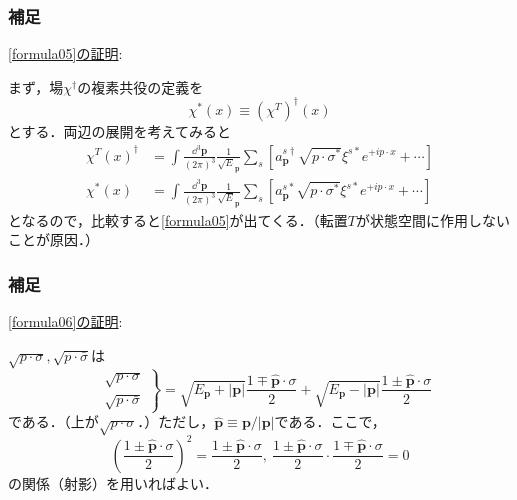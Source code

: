 \documentclass[pdflatex,unicode,ja=standard,12pt]{beamer}
\begin{document}
\begin{frame}[noframenumbering]

  \frametitle{補足 \subsecname}
  \thispagestyle{empty}

  \uline{\eqref{formula05}の証明}:

  \vspace{10pt}

  まず，場$\chi^{\dag}$の複素共役の定義を
  \begin{equation}
    \chi^{*}(x)
    \equiv
    (\chi^{T})^{\dag}(x)
  \end{equation}
  とする．両辺の展開を考えてみると
  \begin{align}    
    {\chi^{T}(x)}^{\dag}
    &=
    \int\frac{\dd^3\mathbf{p}}{(2\pi)^3}
    \frac{1}{\sqrt{E}_{\mathbf{p}}}
    \sum_{s}
    \left[  
      a_{\mathbf{p}}^{s\dag}
      \sqrt{p\cdot\sigma^{*}}\xi^{s*}e^{+ip\cdot x}
      +
      \cdots
    \right]
    \\    
    \chi^{*}(x)
    &=
    \int\frac{\dd^3\mathbf{p}}{(2\pi)^3}
    \frac{1}{\sqrt{E}_{\mathbf{p}}}
    \sum_{s}
    \left[  
      a_{\mathbf{p}}^{s*}
      \sqrt{p\cdot\sigma^{*}}\xi^{s*}e^{+ip\cdot x}
      +
      \cdots
    \right]
  \end{align}
  となるので，比較すると\eqref{formula05}が出てくる．（転置$T$が状態空間に作用しないことが原因．）

\end{frame}


\begin{frame}[noframenumbering]

  \frametitle{補足 \subsecname}
  \thispagestyle{empty}

  \uline{\eqref{formula06}の証明}:

  \vspace{10pt}

  $\sqrt{p\cdot\sigma},\sqrt{p\cdot\bar{\sigma}}$は
  \begin{equation}
    \left.
      \begin{alignedat}{1}
        &\sqrt{p\cdot\sigma}
        \\
        &\sqrt{p\cdot\bar{\sigma}}
      \end{alignedat}
    \right\}
    =
    \sqrt{E_{\mathbf{p}}+|\mathbf{p}|}
    \frac{1\mp\hat{\mathbf{p}}\cdot\sigma}{2}
    +
    \sqrt{E_{\mathbf{p}}-|\mathbf{p}|}
    \frac{1\pm\hat{\mathbf{p}}\cdot\sigma}{2}
  \end{equation}
  である．（上が$\sqrt{p\cdot\sigma}$．）ただし，$\hat{\mathbf{p}}\equiv\mathbf{p}/|\mathbf{p}|$である．ここで，
  \begin{equation}
    \left(  
      \frac{1\pm\hat{\mathbf{p}}\cdot\sigma}{2}
    \right)^2
    =    
    \frac{1\pm\hat{\mathbf{p}}\cdot\sigma}{2}
    ,\ 
    \frac{1\pm\hat{\mathbf{p}}\cdot\sigma}{2}
    \cdot
    \frac{1\mp\hat{\mathbf{p}}\cdot\sigma}{2}
    =
    0
  \end{equation}
  の関係（射影）を用いればよい．

\end{frame}
\end{document}
